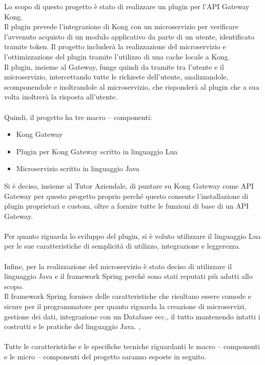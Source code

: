 Lo scopo di questo progetto è stato di realizzare un plugin per l'API Gateway Kong.\\
Il plugin prevede l'integrazione di Kong con un microservizio per verificare l'avvenuto acquisto di un modulo applicativo da parte di un utente, identificato tramite token.
Il progetto includerà la realizzazione del microservizio e l'ottimizzazione del plugin tramite l'utilizzo di una cache locale a Kong.\\
Il plugin, insieme al Gateway, funge quindi da tramite tra l'utente e il microservizio, intercettando tutte le richieste dell'utente, analizzandole, scomponendole e 
inoltrandole al microservizio, che risponderà al plugin che a sua volta inoltrerà la risposta all'utente.\\ \\
Quindi, il progetto ha tre macro – componenti:
\begin{itemize}
\item Kong Gateway
\item Plugin per Kong Gateway scritto in linguaggio Lua
\item Microservizio scritto in linguaggio Java
\end{itemize}

Si è deciso, insieme al Tutor Aziendale, di puntare su Kong Gateway come API Gateway per questo progetto proprio perché questo consente l'installazione di plugin 
proprietari e custom, oltre a fornire tutte le funzioni di base di un API Gateway. \cite{Kong}\\ \\
Per quanto riguarda lo sviluppo del plugin, si è voluto utilizzare il linguaggio Lua per le sue caratteristiche di semplicità di utilizzo, integrazione e leggerezza.\\ \\

Infine, per la realizzazione del microservizio è stato deciso di utilizzare il linguaggio Java e il framework Spring perché sono stati reputati più adatti allo scopo.\\
Il framework Spring fornisce delle caratteristiche che risultano essere comode e sicure per il programmatore per quanto riguarda la creazione di microservizi, 
gestione dei dati, integrazione con un Database ecc., il tutto mantenendo intatti i costrutti e le pratiche del linguaggio Java. \cite{Java}, \cite{SpringFramework}
\\ \\
Tutte le caratteristiche e le specifiche tecniche riguardanti le macro – componenti e le micro – componenti del progetto saranno esposte in seguito.

